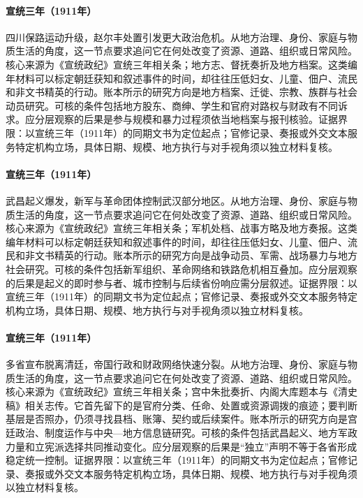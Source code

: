 \hypertarget{social:EQ-1911-SICHUAN-RAILWAY-PROTEST}{}\paragraph{宣统三年（1911年）}四川保路运动升级，赵尔丰处置引发更大政治危机。从地方治理、身份、家庭与物质生活的角度，这一节点要求追问它在何处改变了资源、道路、组织或日常风险。核心来源为《宣统政纪》宣统三年相关条；地方志、督抚奏折及地方档案。这类编年材料可以标定朝廷获知和叙述事件的时间，却往往压低妇女、儿童、佃户、流民和非文书精英的行动。账本所示的研究方向是地方档案、迁徙、宗教、族群与社会动员研究。可核的条件包括地方股东、商绅、学生和官府对路权与财政有不同诉求。应分层观察的后果是参与规模和暴力过程须依当地档案与报刊核验。证据界限：以宣统三年（1911年）的同期文书为定位起点；官修记录、奏报或外交文本服务特定机构立场，具体日期、规模、地方执行与对手视角须以独立材料复核。
\hypertarget{social:EQ-1911-WUCHANG-UPRISING}{}\paragraph{宣统三年（1911年）}武昌起义爆发，新军与革命团体控制武汉部分地区。从地方治理、身份、家庭与物质生活的角度，这一节点要求追问它在何处改变了资源、道路、组织或日常风险。核心来源为《宣统政纪》宣统三年相关条；军机处档、战事方略及地方奏报。这类编年材料可以标定朝廷获知和叙述事件的时间，却往往压低妇女、儿童、佃户、流民和非文书精英的行动。账本所示的研究方向是战争动员、军需、战场暴力与地方社会研究。可核的条件包括新军组织、革命网络和铁路危机相互叠加。应分层观察的后果是起义的即时参与者、城市控制与后续省份响应需分层叙述。证据界限：以宣统三年（1911年）的同期文书为定位起点；官修记录、奏报或外交文本服务特定机构立场，具体日期、规模、地方执行与对手视角须以独立材料复核。
\hypertarget{social:EQ-1911-PROVINCIAL-INDEPENDENCE}{}\paragraph{宣统三年（1911年）}多省宣布脱离清廷，帝国行政和财政网络快速分裂。从地方治理、身份、家庭与物质生活的角度，这一节点要求追问它在何处改变了资源、道路、组织或日常风险。核心来源为《宣统政纪》宣统三年相关条；宫中朱批奏折、内阁大库题本与《清史稿》相关志传。它首先留下的是官府分类、任命、处置或资源调拨的痕迹；要判断基层是否照办，仍须寻找县档、账簿、契约或后续案件。账本所示的研究方向是宫廷政治、制度运作与中央—地方信息链研究。可核的条件包括武昌起义、地方军政力量和立宪派选择共同推动变化。应分层观察的后果是“独立”声明不等于各省形成稳定统一控制。证据界限：以宣统三年（1911年）的同期文书为定位起点；官修记录、奏报或外交文本服务特定机构立场，具体日期、规模、地方执行与对手视角须以独立材料复核。
